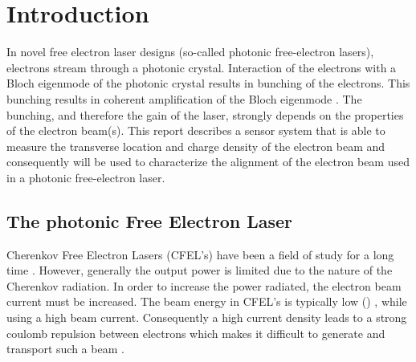 \chapter{Introduction}
\label{sec:introduction}
% 
In novel free electron laser designs (so-called photonic free-electron lasers), electrons stream through a photonic crystal. Interaction of the electrons with a Bloch eigenmode of the photonic crystal results in bunching of the electrons. This bunching results in coherent amplification of the Bloch eigenmode \cite{Denis}.
The bunching, and therefore the gain of the laser, strongly depends on the properties of the electron beam(s).
This report describes a sensor system that is able to measure the transverse location and charge density of the electron beam and consequently will be used to characterize the alignment of the electron beam used in a photonic free-electron laser.
%

\section{The photonic Free Electron Laser}
Cherenkov Free Electron Lasers (CFEL's) have been a field of study for a long time . However, generally the output power is limited due to the nature of the Cherenkov radiation.
In order to increase the power radiated, the electron beam current must be increased. The beam energy in CFEL's is typically low () , while using a high beam current. Consequently a high current density leads to a strong coulomb repulsion between electrons which makes it difficult to generate and transport such a beam .

